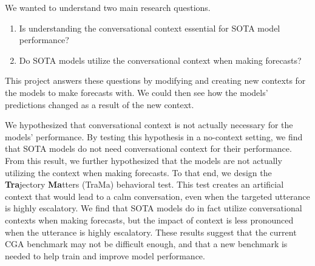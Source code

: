 We wanted to understand two main research questions.
\begin{enumerate}
    \item Is understanding the conversational context essential for SOTA model performance?
    \item Do SOTA models utilize the conversational context when making forecasts?
\end{enumerate}
This project answers these questions by modifying and creating new contexts for the models to make forecasts with. 
We could then see how the models' predictions changed as a result of the new context. 

We hypothesized that conversational context is not actually necessary for the models' performance. 
By testing this hypothesis in a no-context setting, we find that SOTA models do not need conversational context for their performance.
From this result, we further hypothesized that the models are not actually utilizing the context when making forecasts. 
To that end, we design the \textbf{Tra}jectory \textbf{Ma}tters (TraMa) behavioral test.
This test creates an artificial context that would lead to a calm conversation, even when the targeted utterance is highly escalatory.
We find that SOTA models do in fact utilize conversational contexts when making forecasts, but the impact of context is less pronounced when the utterance is highly escalatory.
These results suggest that the current CGA benchmark may not be difficult enough, and that a new benchmark is needed to help train and improve model performance. 
